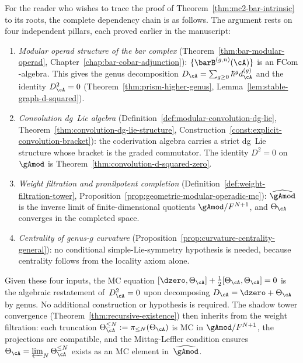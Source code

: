 \begin{remark}
\label{rem:mc2-foundational-chain}
For the reader who wishes to trace the proof of
Theorem~\ref{thm:mc2-bar-intrinsic} to its roots, the complete
dependency chain is as follows.
The argument rests on four independent pillars, each proved
earlier in the manuscript:
\begin{enumerate}[label=\textup{(\arabic*)}]
\item \emph{Modular operad structure of the bar complex}
  (Theorem~\ref{thm:bar-modular-operad},
  Chapter~\ref{chap:bar-cobar-adjunction}):
  $\{\barB^{(g,n)}(\cA)\}$ is an
  $\mathsf{F}\mathrm{Com}$-algebra.
  This gives the genus decomposition
  $D_\cA = \sum_{g \geq 0} \hbar^g d_\cA^{(g)}$
  and the identity $D_\cA^2 = 0$
  (Theorem~\ref{thm:prism-higher-genus},
  Lemma~\ref{lem:stable-graph-d-squared}).
\item \emph{Convolution dg~Lie algebra}
  (Definition~\ref{def:modular-convolution-dg-lie},
  Theorem~\ref{thm:convolution-dg-lie-structure},
  Construction~\ref{const:explicit-convolution-bracket}):
  the coderivation algebra carries a strict dg~Lie structure
  whose bracket is the graded commutator.
  The identity $D^2 = 0$ on $\gAmod$ is
  Theorem~\ref{thm:convolution-d-squared-zero}.
\item \emph{Weight filtration and pronilpotent completion}
  (Definition~\ref{def:weight-filtration-tower},
  Proposition~\ref{prop:geometric-modular-operadic-mc}):
  $\widehat{\gAmod}$ is the inverse limit of
  finite-dimensional quotients $\gAmod/F^{N+1}$, and
  $\Theta_\cA$ converges in the completed space.
\item \emph{Centrality of genus-$g$ curvature}
  (Proposition~\ref{prop:curvature-centrality-general}):
  no conditional simple-Lie-symmetry hypothesis is needed,
  because centrality follows from the locality axiom alone.
\end{enumerate}
Given these four inputs, the MC equation
$[\dzero, \Theta_\cA] + \tfrac{1}{2}[\Theta_\cA, \Theta_\cA] = 0$
is the algebraic restatement of~$D_\cA^2 = 0$ upon decomposing
$D_\cA = \dzero + \Theta_\cA$ by genus.
No additional construction or hypothesis is required.
The shadow tower convergence
(Theorem~\ref{thm:recursive-existence}) then inherits
from the weight filtration: each truncation
$\Theta_\cA^{\leq N} := \pi_{\leq N}(\Theta_\cA)$ is MC
in $\gAmod/F^{N+1}$, the projections are compatible, and the
Mittag-Leffler condition ensures
$\Theta_\cA = \varprojlim_N \Theta_\cA^{\leq N}$ exists as
an MC element in~$\widehat{\gAmod}$.
\end{remark}

